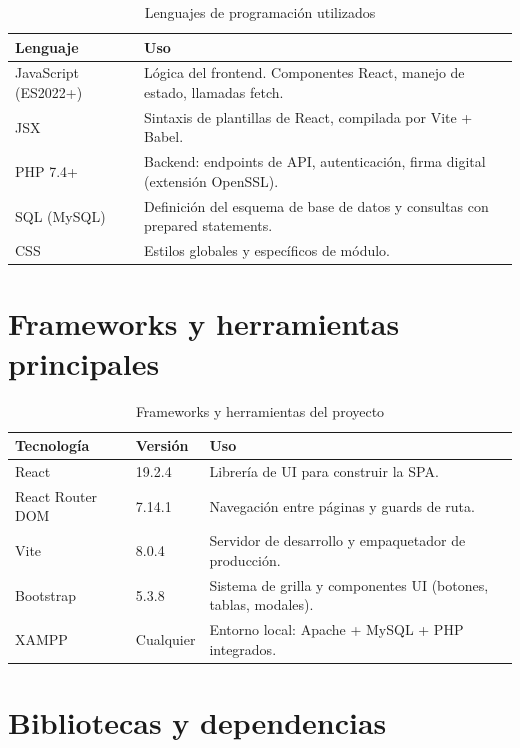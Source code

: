\documentclass[10pt,letterpaper]{report}
\begin{document}
\begin{table}[H]
\centering
\caption{Lenguajes de programación utilizados}
\label{tab:lenguajes}
\begin{tabular}{p{} p{}}
\toprule
\textbf{Lenguaje} & \textbf{Uso} \\
\midrule
JavaScript (ES2022+) & Lógica del frontend. Componentes React, manejo de estado, llamadas fetch. \\
JSX & Sintaxis de plantillas de React, compilada por Vite + Babel. \\
PHP 7.4+ & Backend: endpoints de API, autenticación, firma digital (extensión OpenSSL). \\
SQL (MySQL) & Definición del esquema de base de datos y consultas con prepared statements. \\
CSS & Estilos globales y específicos de módulo. \\
\bottomrule
\end{tabular}
\end{table}

\section{Frameworks y herramientas principales}

\begin{table}[H]
\centering
\caption{Frameworks y herramientas del proyecto}
\label{tab:frameworks}
\begin{tabular}{p{} p{} p{}}
\toprule
\textbf{Tecnología} & \textbf{Versión} & \textbf{Uso} \\
\midrule
React & 19.2.4 & Librería de UI para construir la SPA. \\
React Router DOM & 7.14.1 & Navegación entre páginas y guards de ruta. \\
Vite & 8.0.4 & Servidor de desarrollo y empaquetador de producción. \\
Bootstrap & 5.3.8 & Sistema de grilla y componentes UI (botones, tablas, modales). \\
XAMPP & Cualquier & Entorno local: Apache + MySQL + PHP integrados. \\
\bottomrule
\end{tabular}
\end{table}

\section{Bibliotecas y dependencias}
\end{document}
